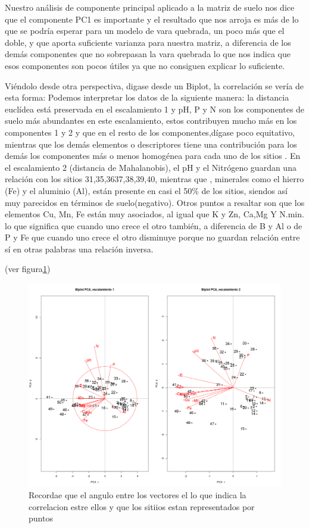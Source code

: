 \documentclass[11pt,]{article}
\begin{document}
Nuestro análisis de componente principal aplicado a la matriz de suelo
nos dice que el componente PC1 es importante y el resultado que nos
arroja es más de lo que se podría esperar para un modelo de vara
quebrada, un poco más que el doble, y que aporta suficiente varianza
para nuestra matriz, a diferencia de los demás componentes que no
sobrepasan la vara quebrada lo que nos indica que esos componentes son
pocos útiles ya que no consiguen explicar lo suficiente.

Viéndolo desde otra perspectiva, digase desde un Biplot, la correlación
se vería de esta forma: Podemos interpretar los datos de la siguiente
manera: la distancia euclídea está preservada en el escalamiento 1 y pH,
P y N son los componentes de suelo más abundantes en este escalamiento,
estos contribuyen mucho más en los componentes 1 y 2 y que en el resto
de los componentes,dígase poco equitativo, mientras que los demás
elementos o descriptores tiene una contribución para los demás los
componentes más o menos homogénea para cada uno de los sitios . En el
escalamiento 2 (distancia de Mahalanobis), el pH y el Nitrógeno guardan
una relación con los sitios 31,35,3637,38,39,40, mientras que ,
minerales como el hierro (Fe) y el aluminio (Al), están presente en casi
el 50\% de los sitios, siendos así muy parecidos en términos de
suelo(negativo). Otros puntos a resaltar son que los elementos Cu, Mn,
Fe están muy asociados, al igual que K y Zn, Ca,Mg Y N.min. lo que
significa que cuando uno crece el otro también, a diferencia de B y Al o
de P y Fe que cuando uno crece el otro disminuye porque no guardan
relación entre sí en otras palabras una relación inversa.

(ver figura\ref{fig:Biplot_pca1_pca2})

\begin{figure}
\centering
\includegraphics{Biplot_pca1_pca2.png}
\caption{\label{fig:Biplot_pca1_pca2}Recordae que el angulo entre los
vectores el lo que indica la correlacion estre ellos y que los sitiios
estan representados por puntos}
\end{figure}
\end{document}
